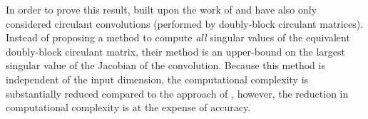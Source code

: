 In order to prove this result, \citet{singla2019bounding} built upon the work of \citet{sedghi2018singular} and have also only considered circulant convolutions (performed by doubly-block circulant matrices).
Instead of proposing a method to compute \emph{all} singular values of the equivalent doubly-block circulant matrix, their method is an upper-bound on the largest singular value of the Jacobian of the convolution. 
Because this method is independent of the input dimension, the computational complexity is substantially reduced compared to the approach of \citet{sedghi2018singular}, however, the reduction in computational complexity is at the expense of accuracy.
 





%

